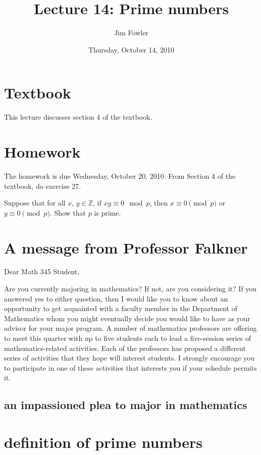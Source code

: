 \documentclass[12pt]{handout}
\title{Lecture 14: Prime numbers}
\author{Jim Fowler}
\date{Thursday, October 14, 2010}
\begin{document}
\maketitle

\section*{Textbook}

This lecture discusses section 4 of the textbook.

\section*{Homework} 

The homework is due Wednesday, October 20, 2010.
From Section 4 of the textbook, do exercise 27.

Suppose that for all $x$, $y\in \mathbb{Z}$, if $xy\equiv 0 \mod p$,
then $x \equiv 0 \pmod p$ or $y\equiv 0 \pmod p$.  Show that $p$ is
prime.

\section*{A message from Professor Falkner}

Dear Math 345 Student,

Are you currently majoring in mathematics?  If not, are you
considering it?  If you answered yes to either question, then I would
like you to know about an opportunity to get acquainted with a faculty
member in the Department of Mathematics whom you might eventually
decide you would like to have as your advisor for your major program.
A number of mathematics professors are offering to meet this quarter
with up to five students each to lead a five-session series of
mathematics-related activities.  Each of the professors has proposed a
different series of activities that they hope will interest students.
I strongly encourage you to participate in one of these activities
that interests you if your schedule permits it.

\subsection*{an impassioned plea to major in mathematics}

\section*{definition of prime numbers}
\end{document}
